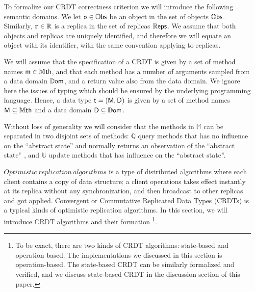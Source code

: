 To formalize our CRDT correctness criterion we will introduce the
following semantic domains.
%
We let $\mathtt{o} \in \mathbb{O}\mathsf{bs}$ be an object in the set of objects $\mathbb{O}\mathsf{bs}$. Similarly,
$\mathtt{r} \in \mathbb{R}$ is a replica in the set of replicas
$\mathbb{R}\mathsf{eps}$.
We assume that both objects and replicas are uniquely identified, and
therefore we will equate an object with its identifier, with the same
convention applying to replicas.

We will assume that the specification of a CRDT is given by a set of
method names $\mathsf{m} \in \mathbb{M}\mathsf{th}$, and that each method has a
number of arguments sampled from a data domain $\mathbb{D}\mathsf{om}$, and a
return value also from the data domain.
We ignore here the issues of typing which should be ensured by the
underlying programming language.
Hence, a data type $\mathsf{t} = (\mathsf{M}, \mathsf{D})$ is given by a
set of method names $\mathsf{M} \subseteq \mathbb{M}\mathsf{th}$ and a data domain
$\mathsf{D} \subseteq \mathbb{D}\mathsf{om}$.



Without loss of generality we will consider that the methods in $\mathbb{M}$ can be separated in two disjoint sets of methods: $\mathbb{Q}$ query methods that has no influence on the ``abstract state'' and normally returns an observation of the ``abstract state'' , and $\mathbb{U}$ update methods that has influence on the ``abstract state''. %

$\mathit{Optimistic \ replication \ algorithms}$ is a type of distributed algorithms where each client contains a copy of data structure; a client operations takes effect instantly at its replica without any synchronization, and then broadcast to other replicas and got applied. Convergent or Commutative Replicated Data Types (CRDTs) is a typical kinds of optimistic replication algorithms. In this section, we will introduce CRDT algorithms and their formation \footnote{To be exact, there are two kinds of CRDT algorithms: state-based and operation based. The implementations we discussed in this section is operation-based. The state-based CRDT can be similarly formalized and verified, and we discuss state-based CRDT in the discussion section of this paper.}.

